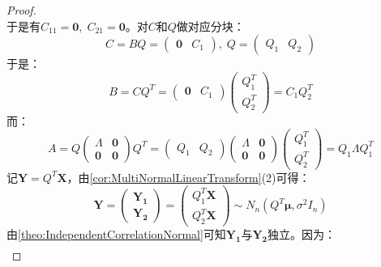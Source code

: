 \begin{proof}
\begin{equation*}
	\end{equation*}
	于是有$C_{11}=\mathbf{0},\;C_{21}=\mathbf{0}$。对$C$和$Q$做对应分块：
	\begin{equation*}
		C=BQ=
		\begin{pmatrix}
			\mathbf{0} & C_1
		\end{pmatrix},\;
		Q=
		\begin{pmatrix}
			Q_1 & Q_2
		\end{pmatrix}
	\end{equation*}
	于是：
	\begin{equation*}
		B=CQ^T=
		\begin{pmatrix}
			\mathbf{0} & C_1
		\end{pmatrix}
		\begin{pmatrix}
			Q_1^T \\
			Q_2^T
		\end{pmatrix}
		=C_1Q_2^T
	\end{equation*}
	而：
	\begin{equation*}
		A=Q
		\begin{pmatrix}
			\varLambda & \mathbf{0} \\
			\mathbf{0} & \mathbf{0}
		\end{pmatrix}
		Q^T
		=
		\begin{pmatrix}
			Q_1 & Q_2
		\end{pmatrix}
		\begin{pmatrix}
			\varLambda & \mathbf{0} \\
			\mathbf{0} & \mathbf{0}
		\end{pmatrix}
		\begin{pmatrix}
			Q_1^T \\
			Q_2^T
		\end{pmatrix}
		=Q_1\varLambda Q_1^T
	\end{equation*}
	记$\mathbf{Y}=Q^T\mathbf{X}$，由\cref{cor:MultiNormalLinearTransform}(2)可得：
	\begin{equation*}
		\mathbf{Y}=
		\begin{pmatrix}
			\mathbf{Y_1} \\
			\mathbf{Y_2}
		\end{pmatrix}
		=
		\begin{pmatrix}
			Q_1^T\mathbf{X} \\
			Q_2^T\mathbf{X}
		\end{pmatrix}
		\sim N_n(Q^T\boldsymbol{\mu},\sigma^2I_n)
	\end{equation*}
	由\cref{theo:IndependentCorrelationNormal}可知$\mathbf{Y_1}$与$\mathbf{Y_2}$独立。因为：
	\begin{gather*}

\end{gather*}
\end{proof}
